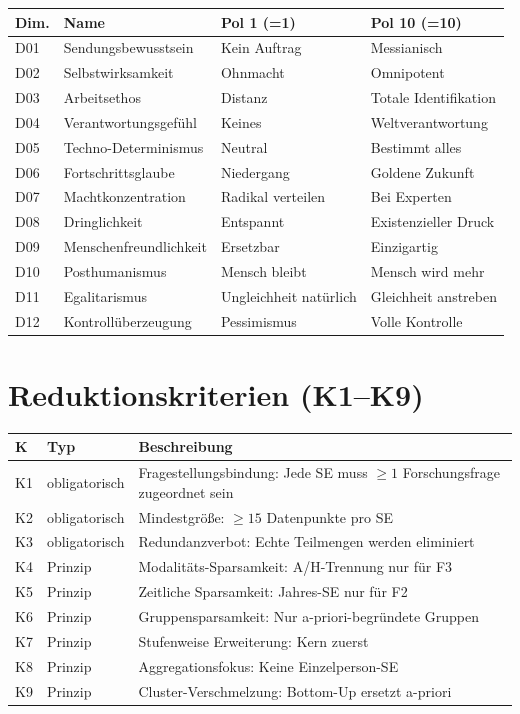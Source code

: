 \documentclass[12pt,a4paper]{article}
\begin{document}
\begin{tabular}{@{} L{1.1cm} L{4.8cm} L{4.3cm} L{4.5cm} @{}}
  \toprule
  \textbf{Dim.} & \textbf{Name} & \textbf{Pol 1 (=1)} & \textbf{Pol 10 (=10)} \\
  \midrule
  D01 & Sendungsbewusstsein & Kein Auftrag & Messianisch \\
  D02 & Selbstwirksamkeit & Ohnmacht & Omnipotent \\
  D03 & Arbeitsethos & Distanz & Totale Identifikation \\
  D04 & Verantwortungsgefühl & Keines & Weltverantwortung \\
  D05 & Techno-Determinismus & Neutral & Bestimmt alles \\
  D06 & Fortschrittsglaube & Niedergang & Goldene Zukunft \\
  D07 & Machtkonzentration & Radikal verteilen & Bei Experten \\
  D08 & Dringlichkeit & Entspannt & Existenzieller Druck \\
  D09 & Menschenfreundlichkeit & Ersetzbar & Einzigartig \\
  D10 & Posthumanismus & Mensch bleibt & Mensch wird mehr \\
  D11 & Egalitarismus & Ungleichheit natürlich & Gleichheit anstreben \\
  D12 & Kontrollüberzeugung & Pessimismus & Volle Kontrolle \\
  \bottomrule
\end{tabular}


\section{Reduktionskriterien (K1--K9)}
\label{app:reduktion}

\begin{tabular}{@{} L{1.0cm} L{2.8cm} L{10.8cm} @{}}
  \toprule
  \textbf{K} & \textbf{Typ} & \textbf{Beschreibung} \\
  \midrule
  K1 & obligatorisch & Fragestellungsbindung: Jede SE muss $\geq 1$ Forschungsfrage zugeordnet sein \\
  K2 & obligatorisch & Mindestgröße: $\geq 15$ Datenpunkte pro SE \\
  K3 & obligatorisch & Redundanzverbot: Echte Teilmengen werden eliminiert \\
  K4 & Prinzip & Modalitäts-Sparsamkeit: A/H-Trennung nur für F3 \\
  K5 & Prinzip & Zeitliche Sparsamkeit: Jahres-SE nur für F2 \\
  K6 & Prinzip & Gruppensparsamkeit: Nur a-priori-begründete Gruppen \\
  K7 & Prinzip & Stufenweise Erweiterung: Kern zuerst \\
  K8 & Prinzip & Aggregationsfokus: Keine Einzelperson-SE \\
  K9 & Prinzip & Cluster-Verschmelzung: Bottom-Up ersetzt a-priori \\
  \bottomrule
\end{tabular}
\end{document}
